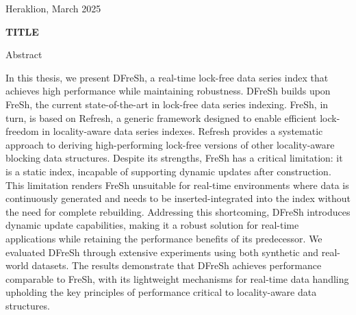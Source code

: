 \documentclass[a4paper,11pt,twoside,openany]{book}
\newcommand{\thesisdate}{March 2025 }
\begin{document}
\begin{titlepage}
\begin{center}
\vfill Heraklion, \thesisdate{}
\end{center}

\thispagestyle{empty}

\end{titlepage}

\cleardoublepage








\thispagestyle{empty}
\begin{titlepage}
\begin{center}
\bc \Large{ \textbf{TITLE}} \ec {}\\\ec
\end{center}

Abstract

In this thesis, we present DFreSh, a real-time lock-free data series index that 
achieves high performance while maintaining robustness. DFreSh builds upon FreSh,
the current state-of-the-art in lock-free data series indexing. FreSh, in turn,
is based on Refresh, a generic framework designed to enable efficient lock-freedom
in locality-aware data series indexes. Refresh provides a systematic approach
to deriving high-performing lock-free versions of other locality-aware blocking
data structures.
Despite its strengths, FreSh has a critical limitation: 
it is a static index, incapable of supporting dynamic updates after construction.
This limitation renders FreSh unsuitable for real-time environments where data
is continuously generated and needs to be inserted-integrated into the index
without the need for complete rebuilding. Addressing this shortcoming,
DFreSh introduces dynamic update capabilities, making it a robust solution
for real-time applications while retaining the performance benefits of its predecessor.
We evaluated DFreSh through extensive experiments using both synthetic
and real-world datasets. The results demonstrate that DFreSh achieves
performance comparable to FreSh, with its lightweight mechanisms for
real-time data handling upholding the key principles of performance critical
to locality-aware data structures. 
\vfill
\end{titlepage}

\cleardoublepage
\end{document}

